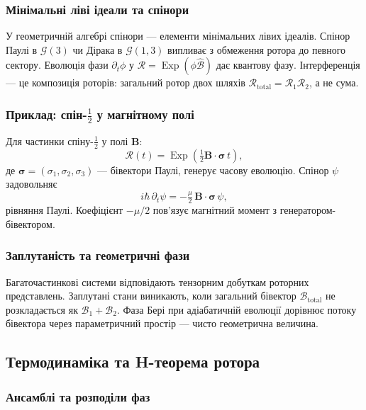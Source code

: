 \documentclass[11pt,a4paper]{article}
\newcommand{\Exp}{\operatorname{Exp}}
\newcommand{\Rotor}{\mathcal{R}}
\newcommand{\Biv}{\mathcal{B}}
\theoremstyle{definition}
\theoremstyle{plain}
\theoremstyle{remark}
\begin{document}
\subsubsection{Мінімальні ліві ідеали та спінори}

У геометричній алгебрі спінори — елементи мінімальних лівих ідеалів. Спінор Паулі в $\mathcal{G}(3)$ чи Дірака в $\mathcal{G}(1,3)$ випливає з обмеження ротора до певного сектору. Еволюція фази $\partial_t \phi$ у $\Rotor = \Exp(\phi\hat{\Biv})$ дає квантову фазу. Інтерференція — це композиція роторів: загальний ротор двох шляхів $\Rotor_{\text{total}} = \Rotor_1 \Rotor_2$, а не сума.

\subsubsection{Приклад: спін-$\tfrac{1}{2}$ у магнітному полі}

Для частинки спіну-$\tfrac{1}{2}$ у полі $\mathbf{B}$:
\begin{equation}
\Rotor(t) = \Exp\!\left(\tfrac{1}{2}\mathbf{B}\cdot\bm{\sigma}\, t\right),
\end{equation}
де $\bm{\sigma} = (\sigma_1, \sigma_2, \sigma_3)$ — бівектори Паулі, генерує часову еволюцію. Спінор $\psi$ задовольняє
\begin{equation}
i\hbar\, \partial_t \psi = -\tfrac{\mu}{2}\, \mathbf{B}\cdot\bm{\sigma}\, \psi,
\end{equation}
рівняння Паулі. Коефіцієнт $-\mu/2$ пов’язує магнітний момент з генератором-бівектором.

\subsubsection{Заплутаність та геометричні фази}

Багаточастинкові системи відповідають тензорним добуткам роторних представлень. Заплутані стани виникають, коли загальний бівектор $\Biv_{\text{total}}$ не розкладається як $\Biv_1 + \Biv_2$. Фаза Бері при адіабатичній еволюції дорівнює потоку бівектора через параметричний простір — чисто геометрична величина.

\subsection{Термодинаміка та H-теорема ротора}

\subsubsection{Ансамблі та розподіли фаз}
\end{document}
